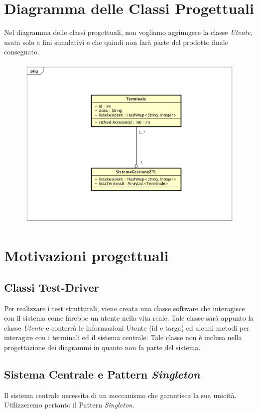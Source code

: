 \documentclass[12pt, letterpaper]{article}
\begin{document}
\section{Diagramma delle Classi Progettuali}
Nel diagramma delle classi progettuali, non vogliamo 
aggiungere la classe \emph{Utente}, usata solo a fini
simulativi e che quindi non farà parte del prodotto
finale consegnato.
\begin{figure}[H]
    \centering
    \includegraphics[scale=0.45]{DCD}
    \label{fig:mesh1}
\end{figure}


\section{Motivazioni progettuali}
\subsection{Classi Test-Driver}
Per realizzare i test strutturali, viene creata una
classe software che interagisce con il sistema come 
farebbe un utente nella vita reale. 
Tale classe sarà appunto la classe \emph{Utente} e conterrà
le informazioni Utente (id e targa) ed alcuni 
metodi per interagire con i terminali ed il 
sistema centrale. Tale classe non è inclusa 
nella progettazione dei diagrammi in quanto 
non fa parte del sistema.

\subsection{Sistema Centrale e Pattern \emph{Singleton}}
Il sistema centrale necessita di un meccanismo che 
garantisca la sua unicità. Utilizzeremo pertanto
il Pattern \emph{Singleton}.
\end{document}
